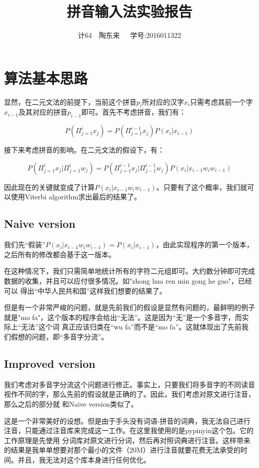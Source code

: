 \documentclass[a4paper,10pt]{article}
\title{拼音输入法实验报告}
\author{计64~~陶东来~~~学号:2016011322}
\begin{document}
  \maketitle
  \section{算法基本思路}

  显然，在二元文法的前提下，当前这个拼音$p_i$所对应的汉字$x_i$只需考虑其前一个字$x_{i-1}$及其对应的拼音$p_{i-1}$即可。首先不考虑拼音，我们有：

  \[
    P(\Pi_{j=1}^{i} x_{j}) = P(\Pi_{j=1}^{i-1} x_{j}) P(x_{i}|x_{i-1})
  \]

  接下来考虑拼音的影响。在二元文法的假设下，有：

  \[
  P(\Pi_{j=1}^{i} x_{j} | \Pi_{j=1}^{i} w_j) = P(\Pi_{j=1}^{i-1} x_{j} | \Pi_{j-1}^{i-1} w_j) P(x_{i}|x_{i-1} w_{i} w_{i-1})
  \]

  因此现在的关键就变成了计算$P(x_{i}|x_{i-1} w_{i} w_{i-1})$。只要有了这个概率，我们就可以使用Viterbi algorithm求出最后的结果了。

  \subsection{Naive version}
  我们先“假装”$P(x_{i}|x_{i-1} w_{i} w_{i-1})=P(x_{i} | x_{i-1})$，由此实现程序的第一个版本，之后所有的修改都会基于这一版本。

  在这种情况下，我们只需简单地统计所有的字符二元组即可。大约数分钟即可完成数据的收集，并且可以应付很多情况。如"zhong hua ren min gong he guo"，已经可以
  得出“中华人民共和国”这样我们想要的结果了。

  但是有一个非常严峻的问题，就是先前我们的假设是显然有问题的，最鲜明的例子就是"mo fa"，这个版本的程序会给出“无法”。这是因为“无”是一个多音字，而实际上“无法”这个词
  真正应该归类在“wu fa”而不是“mo fa”。这就体现出了先前我们假想的问题，即“多音字分流”。

  \subsection{Improved version}

  我们考虑对多音字分流这个问题进行修正。事实上，只要我们将多音字的不同读音视作不同的字，那么先前的假设就是正确的了。因此，我们考虑对原文进行注音，那么之后的部分就
  和Naive version类似了。

  这是一个非常美好的设想。但是由于手头没有词语-拼音的词典，我无法自己进行注音，只能通过注音库来完成这一工作。在这里我使用的是pypinyin这个包。它的工作原理是先使用
  分词库对原文进行分词，然后再对照词典进行注音。这样带来的结果是我单单想要对那个最小的文件（20M）进行注音就要花费无法承受的时间。并且，我无法对这个库本身进行任何优化。
\end{document}
